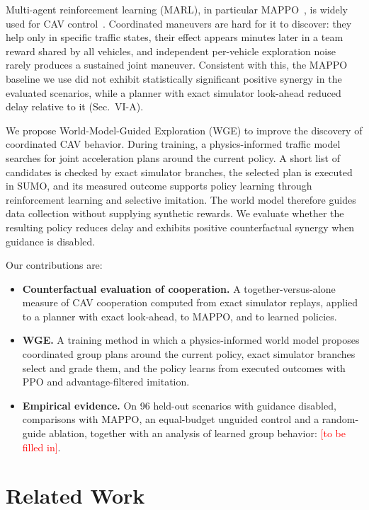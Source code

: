 \documentclass[conference]{IEEEtran}
\newcommand{\tbf}{\textcolor{red}{[to be filled in]}}
\begin{document}
Multi-agent reinforcement learning (MARL), in particular MAPPO~\cite{yu_mappo2022}, is widely used for CAV control~\cite{chen_merge2021,wu_flow2022}. Coordinated maneuvers are hard for it to discover: they help only in specific traffic states, their effect appears minutes later in a team reward shared by all vehicles, and independent per-vehicle exploration noise rarely produces a sustained joint maneuver. Consistent with this, the MAPPO baseline we use did not exhibit statistically significant positive synergy in the evaluated scenarios, while a planner with exact simulator look-ahead reduced delay relative to it (Sec.~VI-A).

We propose World-Model-Guided Exploration (WGE) to improve the discovery of coordinated CAV behavior. During training, a physics-informed traffic model searches for joint acceleration plans around the current policy. A short list of candidates is checked by exact simulator branches, the selected plan is executed in SUMO, and its measured outcome supports policy learning through reinforcement learning and selective imitation. The world model therefore guides data collection without supplying synthetic rewards. We evaluate whether the resulting policy reduces delay and exhibits positive counterfactual synergy when guidance is disabled.

Our contributions are:
\begin{itemize}
\item \textbf{Counterfactual evaluation of cooperation.} A together-versus-alone measure of CAV cooperation computed from exact simulator replays, applied to a planner with exact look-ahead, to MAPPO, and to learned policies.
\item \textbf{WGE.} A training method in which a physics-informed world model proposes coordinated group plans around the current policy, exact simulator branches select and grade them, and the policy learns from executed outcomes with PPO and advantage-filtered imitation.
\item \textbf{Empirical evidence.} On 96 held-out scenarios with guidance disabled, comparisons with MAPPO, an equal-budget unguided control and a random-guide ablation, together with an analysis of learned group behavior: \tbf.
\end{itemize}

\section{Related Work}
\end{document}
